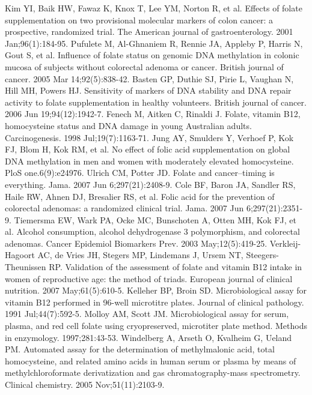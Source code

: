 \begin{thebibliography}{12}
		Kim YI, Baik HW, Fawaz K, Knox T, Lee YM, Norton R, et al. Effects of folate supplementation on two provisional molecular markers of colon cancer: a prospective, randomized trial. The American journal of gastroenterology. 2001 Jan;96(1):184-95. 
		Pufulete M, Al-Ghnaniem R, Rennie JA, Appleby P, Harris N, Gout S, et al. Influence of folate status on genomic DNA methylation in colonic mucosa of subjects without colorectal adenoma or cancer. British journal of cancer. 2005 Mar 14;92(5):838-42. 
		Basten GP, Duthie SJ, Pirie L, Vaughan N, Hill MH, Powers HJ. Sensitivity of markers of DNA stability and DNA repair activity to folate supplementation in healthy volunteers. British journal of cancer. 2006 Jun 19;94(12):1942-7. 
		Fenech M, Aitken C, Rinaldi J. Folate, vitamin B12, homocysteine status and DNA damage in young Australian adults. Carcinogenesis. 1998 Jul;19(7):1163-71. 
		Jung AY, Smulders Y, Verhoef P, Kok FJ, Blom H, Kok RM, et al. No effect of folic acid supplementation on global DNA methylation in men and women with moderately elevated homocysteine. PloS one.6(9):e24976. 
		Ulrich CM, Potter JD. Folate and cancer--timing is everything. Jama. 2007 Jun 6;297(21):2408-9. 
		Cole BF, Baron JA, Sandler RS, Haile RW, Ahnen DJ, Bresalier RS, et al. Folic acid for the prevention of colorectal adenomas: a randomized clinical trial. Jama. 2007 Jun 6;297(21):2351-9. 
		Tiemersma EW, Wark PA, Ocke MC, Bunschoten A, Otten MH, Kok FJ, et al. Alcohol consumption, alcohol dehydrogenase 3 polymorphism, and colorectal adenomas. Cancer Epidemiol Biomarkers Prev. 2003 May;12(5):419-25. 
		Verkleij-Hagoort AC, de Vries JH, Stegers MP, Lindemans J, Ursem NT, Steegers-Theunissen RP. Validation of the assessment of folate and vitamin B12 intake in women of reproductive age: the method of triads. European journal of clinical nutrition. 2007 May;61(5):610-5. 
		Kelleher BP, Broin SD. Microbiological assay for vitamin B12 performed in 96-well microtitre plates. Journal of clinical pathology. 1991 Jul;44(7):592-5. 
		Molloy AM, Scott JM. Microbiological assay for serum, plasma, and red cell folate using cryopreserved, microtiter plate method. Methods in enzymology. 1997;281:43-53. 
		Windelberg A, Arseth O, Kvalheim G, Ueland PM. Automated assay for the determination of methylmalonic acid, total homocysteine, and related amino acids in human serum or plasma by means of methylchloroformate derivatization and gas chromatography-mass spectrometry. Clinical chemistry. 2005 Nov;51(11):2103-9. 

\end{thebibliography}
